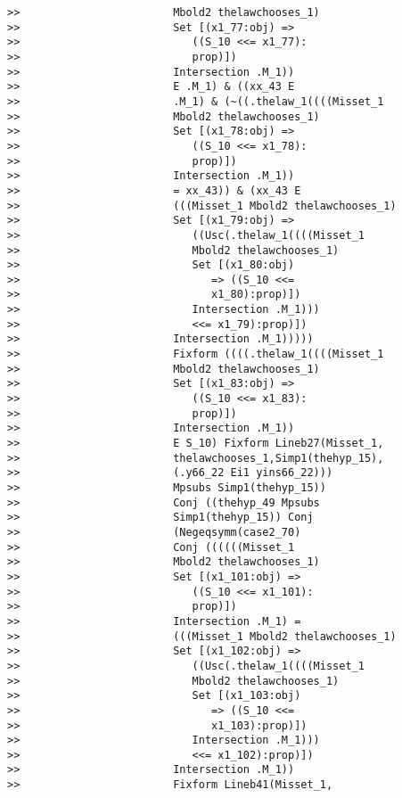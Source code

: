 \documentclass[12pt]{article}
\begin{document}
\begin{verbatim}
>>                        Mbold2 thelawchooses_1)
>>                        Set [(x1_77:obj) =>
>>                           ((S_10 <<= x1_77):
>>                           prop)])
>>                        Intersection .M_1))
>>                        E .M_1) & ((xx_43 E
>>                        .M_1) & (~((.thelaw_1((((Misset_1
>>                        Mbold2 thelawchooses_1)
>>                        Set [(x1_78:obj) =>
>>                           ((S_10 <<= x1_78):
>>                           prop)])
>>                        Intersection .M_1))
>>                        = xx_43)) & (xx_43 E
>>                        (((Misset_1 Mbold2 thelawchooses_1)
>>                        Set [(x1_79:obj) =>
>>                           ((Usc(.thelaw_1((((Misset_1
>>                           Mbold2 thelawchooses_1)
>>                           Set [(x1_80:obj)
>>                              => ((S_10 <<=
>>                              x1_80):prop)])
>>                           Intersection .M_1)))
>>                           <<= x1_79):prop)])
>>                        Intersection .M_1)))))
>>                        Fixform ((((.thelaw_1((((Misset_1
>>                        Mbold2 thelawchooses_1)
>>                        Set [(x1_83:obj) =>
>>                           ((S_10 <<= x1_83):
>>                           prop)])
>>                        Intersection .M_1))
>>                        E S_10) Fixform Lineb27(Misset_1,
>>                        thelawchooses_1,Simp1(thehyp_15),
>>                        (.y66_22 Ei1 yins66_22)))
>>                        Mpsubs Simp1(thehyp_15))
>>                        Conj ((thehyp_49 Mpsubs
>>                        Simp1(thehyp_15)) Conj
>>                        (Negeqsymm(case2_70)
>>                        Conj ((((((Misset_1
>>                        Mbold2 thelawchooses_1)
>>                        Set [(x1_101:obj) =>
>>                           ((S_10 <<= x1_101):
>>                           prop)])
>>                        Intersection .M_1) =
>>                        (((Misset_1 Mbold2 thelawchooses_1)
>>                        Set [(x1_102:obj) =>
>>                           ((Usc(.thelaw_1((((Misset_1
>>                           Mbold2 thelawchooses_1)
>>                           Set [(x1_103:obj)
>>                              => ((S_10 <<=
>>                              x1_103):prop)])
>>                           Intersection .M_1)))
>>                           <<= x1_102):prop)])
>>                        Intersection .M_1))
>>                        Fixform Lineb41(Misset_1,

\end{verbatim}
\end{document}
